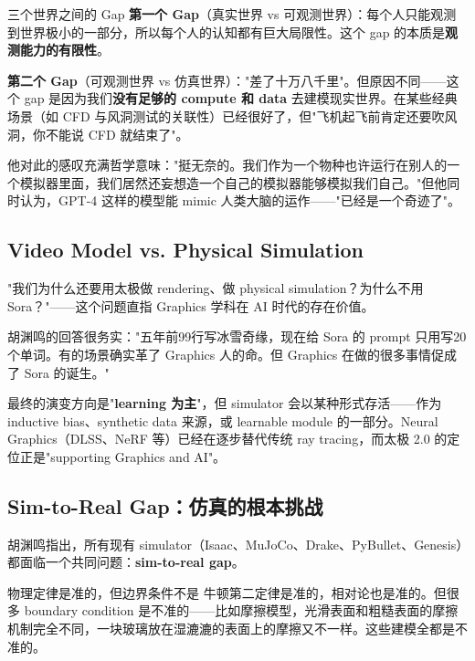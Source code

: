 \documentclass[a4paper]{article}
\begin{document}
\begin{importantbox}{三个世界之间的 Gap}
\textbf{第一个 Gap}（真实世界 vs 可观测世界）：每个人只能观测到世界极小的一部分，所以每个人的认知都有巨大局限性。这个 gap 的本质是\textbf{观测能力的有限性}。

\textbf{第二个 Gap}（可观测世界 vs 仿真世界）："差了十万八千里"。但原因不同——这个 gap 是因为我们\textbf{没有足够的 compute 和 data} 去建模现实世界。在某些经典场景（如 CFD 与风洞测试的关联性）已经很好了，但"飞机起飞前肯定还要吹风洞，你不能说 CFD 就结束了"。
\end{importantbox}

他对此的感叹充满哲学意味："挺无奈的。我们作为一个物种也许运行在别人的一个模拟器里面，我们居然还妄想造一个自己的模拟器能够模拟我们自己。"但他同时认为，GPT-4 这样的模型能 mimic 人类大脑的运作——"已经是一个奇迹了"。

\subsection{Video Model vs. Physical Simulation}

"我们为什么还要用太极做 rendering、做 physical simulation？为什么不用 Sora？"——这个问题直指 Graphics 学科在 AI 时代的存在价值。

胡渊鸣的回答很务实："五年前99行写冰雪奇缘，现在给 Sora 的 prompt 只用写20个单词。有的场景确实革了 Graphics 人的命。但 Graphics 在做的很多事情促成了 Sora 的诞生。"

最终的演变方向是"\textbf{learning 为主}"，但 simulator 会以某种形式存活——作为 inductive bias、synthetic data 来源，或 learnable module 的一部分。Neural Graphics（DLSS、NeRF 等）已经在逐步替代传统 ray tracing，而太极 2.0 的定位正是"supporting Graphics and AI"。

\subsection{Sim-to-Real Gap：仿真的根本挑战}

胡渊鸣指出，所有现有 simulator（Isaac、MuJoCo、Drake、PyBullet、Genesis）都面临一个共同问题：\textbf{sim-to-real gap}。

\begin{warningbox}{物理定律是准的，但边界条件不是}
牛顿第二定律是准的，相对论也是准的。但很多 boundary condition 是不准的——比如摩擦模型，光滑表面和粗糙表面的摩擦机制完全不同，一块玻璃放在湿漉漉的表面上的摩擦又不一样。这些建模全都是不准的。
\end{warningbox}
\end{document}
